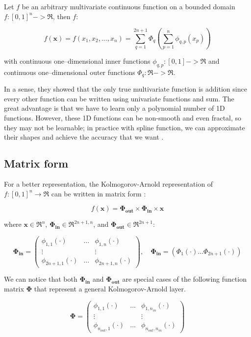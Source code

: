 \documentclass[12pt,a4paper]{article}
\begin{document}
\begin{theorem} 
\label{Kolmogorov-Arnold}
Let $f$ be an arbitrary multivariate continuous function on a bounded domain $f:[0,1]^n -> \Re$, then $f$:

$$f(\textbf{x}) = f(x_1,x_2,...,x_n) = \sum_{q=1}^{2n+1} \Phi_q(\sum_{p=1}^n \phi_{q,p}(x_p))$$

with continuous one–dimensional inner functions $\phi_{q,p}:[0,1] -> \Re$ and continuous one–dimensional outer functions $\Phi_q:\Re -> \Re$.
\end{theorem} 

In a sense, they showed that the only true multivariate function is addition since every other function can be written using univariate functions and sum. The great advantage is that we have to learn only a polynomial number of 1D functions. However, these 1D functions can be non-smooth and even fractal, so they may not be learnable; in practice with spline function, we can approximate their shapes and achieve the accuracy that we want \cite{KAN}.

\subsection{Matrix form}
For a better representation, the Kolmogorov-Arnold representation of $f: [0,1]^n \rightarrow \Re$ can be written in matrix form \cite{KAN}:

$$f(\textbf{x}) = \boldsymbol{\Phi_{out}} \times \boldsymbol{\Phi_{in} }\times \textbf{x}$$

where $\textbf{x} \in \Re^n$, $\boldsymbol{\Phi_{in}} \in \Re^{2n+1,n}$, and $\boldsymbol{\Phi_{out}} \in \Re^{2n+1}$:

\[
\boldsymbol{\Phi_{in}} = 
\begin{pmatrix}
\phi_{1,1}(\cdot) & \dots & \phi_{1,n}(\cdot) \\
\vdots &   & \vdots \\
\phi_{2n+1,1}(\cdot) & \dots & \phi_{2n+1,n}(\cdot)
\end{pmatrix},
\quad \boldsymbol{\Phi_{in}} = (\Phi_{1}(\cdot) \dots \Phi_{2n+1}(\cdot))
\]

We can notice that both $\boldsymbol{\Phi_{in}}$ and $\boldsymbol{\Phi_{out}}$ are special cases of the following function matrix $\boldsymbol{\Phi}$ that represent a general Kolmogorov-Arnold layer. 

\[
\boldsymbol{\Phi} = 
\begin{pmatrix}
\phi_{1,1}(\cdot) & \dots & \phi_{1,n_{in}}(\cdot) \\
\vdots &   & \vdots \\
\phi_{n_{out},1}(\cdot) & \dots & \phi_{n_{out},n_{in}}(\cdot)
\end{pmatrix}
\]
\end{document}
